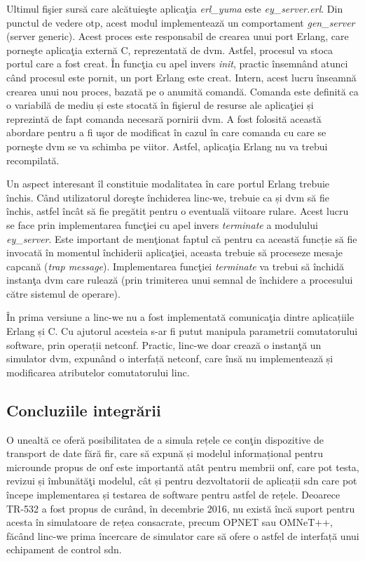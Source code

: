 Ultimul fişier sursă care alcătuieşte aplicaţia \textit{erl\_yuma} este \textit{ey\_server.erl}. Din punctul de vedere \gls{otp}, acest modul implementează un comportament \textit{gen\_server} (server generic). Acest proces este responsabil de crearea unui port Erlang, care porneşte aplicaţia externă C, reprezentată de \gls{dvm}. Astfel, procesul va stoca portul care a fost creat. În funcţia cu apel invers \textit{init}, practic însemnând atunci când procesul este pornit, un port Erlang este creat. Intern, acest lucru înseamnă crearea unui nou proces, bazată pe o anumită comandă. Comanda este definită ca o variabilă de mediu și este stocată în fişierul de resurse ale aplicaţiei și reprezintă de fapt comanda necesară pornirii \gls{dvm}. A fost folosită această abordare pentru a fi uşor de modificat în cazul în care comanda cu care se porneşte \gls{dvm} se va schimba pe viitor. Astfel, aplicaţia Erlang nu va trebui recompilată.

Un aspect interesant îl constituie modalitatea în care portul Erlang trebuie închis. Când utilizatorul doreşte închiderea \gls{linc-we}, trebuie ca și \gls{dvm} să fie închis, astfel încât să fie pregătit pentru o eventuală viitoare rulare. Acest lucru se face prin implementarea funcţiei cu apel invers \textit{terminate} a modulului \textit{ey\_server}. Este important de menţionat faptul că pentru ca această funcție să fie invocată în momentul închiderii aplicaţiei, aceasta trebuie să proceseze mesaje capcană (\textit{trap message}). Implementarea funcţiei \textit{terminate} va trebui să închidă instanţa \gls{dvm} care rulează (prin trimiterea unui semnal de închidere a procesului către sistemul de operare).

În prima versiune a \gls{linc-we} nu a fost implementată comunicaţia dintre aplicațiile Erlang și C. Cu ajutorul acesteia s-ar fi putut manipula parametrii comutatorului software, prin operații \gls{netconf}. Practic, \gls{linc-we} doar crează o instanţă un simulator \gls{dvm}, expunând o interfață \gls{netconf}, care însă nu implementează și modificarea atributelor comutatorului \gls{linc}.

\subsection{Concluziile integrării}

O unealtă ce oferă posibilitatea de a simula rețele ce conţin dispozitive de transport de date fără fir, care să expună și modelul informațional pentru microunde propus de \gls{onf} este importantă atât pentru membrii \gls{onf}, care pot testa, revizui și îmbunătăţi modelul, cât și pentru dezvoltatorii de aplicații \gls{sdn} care pot începe implementarea și testarea de software pentru astfel de rețele. Deoarece TR-532 a fost propus de curând, în decembrie 2016, nu există încă suport pentru acesta în simulatoare de rețea consacrate, precum OPNET sau OMNeT++, făcând \gls{linc-we} prima încercare de simulator care să ofere o astfel de interfață unui echipament de control \gls{sdn}.

